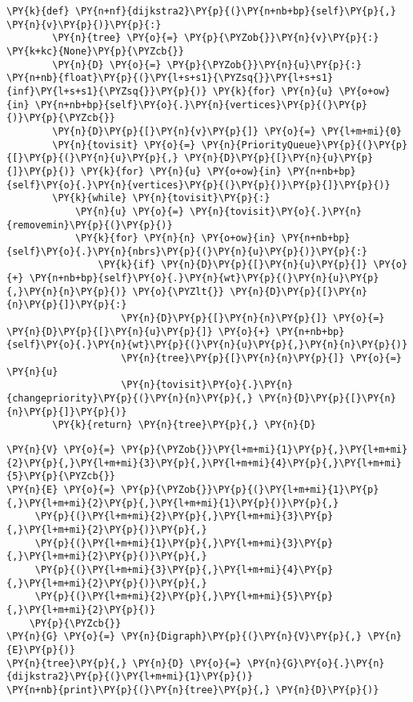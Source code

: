 \begin{Verbatim}[commandchars=\\\{\}]
    \PY{k}{def} \PY{n+nf}{dijkstra2}\PY{p}{(}\PY{n+nb+bp}{self}\PY{p}{,} \PY{n}{v}\PY{p}{)}\PY{p}{:}
        \PY{n}{tree} \PY{o}{=} \PY{p}{\PYZob{}}\PY{n}{v}\PY{p}{:} \PY{k+kc}{None}\PY{p}{\PYZcb{}}
        \PY{n}{D} \PY{o}{=} \PY{p}{\PYZob{}}\PY{n}{u}\PY{p}{:} \PY{n+nb}{float}\PY{p}{(}\PY{l+s+s1}{\PYZsq{}}\PY{l+s+s1}{inf}\PY{l+s+s1}{\PYZsq{}}\PY{p}{)} \PY{k}{for} \PY{n}{u} \PY{o+ow}{in} \PY{n+nb+bp}{self}\PY{o}{.}\PY{n}{vertices}\PY{p}{(}\PY{p}{)}\PY{p}{\PYZcb{}}
        \PY{n}{D}\PY{p}{[}\PY{n}{v}\PY{p}{]} \PY{o}{=} \PY{l+m+mi}{0}
        \PY{n}{tovisit} \PY{o}{=} \PY{n}{PriorityQueue}\PY{p}{(}\PY{p}{[}\PY{p}{(}\PY{n}{u}\PY{p}{,} \PY{n}{D}\PY{p}{[}\PY{n}{u}\PY{p}{]}\PY{p}{)} \PY{k}{for} \PY{n}{u} \PY{o+ow}{in} \PY{n+nb+bp}{self}\PY{o}{.}\PY{n}{vertices}\PY{p}{(}\PY{p}{)}\PY{p}{]}\PY{p}{)}
        \PY{k}{while} \PY{n}{tovisit}\PY{p}{:}
            \PY{n}{u} \PY{o}{=} \PY{n}{tovisit}\PY{o}{.}\PY{n}{removemin}\PY{p}{(}\PY{p}{)}
            \PY{k}{for} \PY{n}{n} \PY{o+ow}{in} \PY{n+nb+bp}{self}\PY{o}{.}\PY{n}{nbrs}\PY{p}{(}\PY{n}{u}\PY{p}{)}\PY{p}{:}
                \PY{k}{if} \PY{n}{D}\PY{p}{[}\PY{n}{u}\PY{p}{]} \PY{o}{+} \PY{n+nb+bp}{self}\PY{o}{.}\PY{n}{wt}\PY{p}{(}\PY{n}{u}\PY{p}{,}\PY{n}{n}\PY{p}{)} \PY{o}{\PYZlt{}} \PY{n}{D}\PY{p}{[}\PY{n}{n}\PY{p}{]}\PY{p}{:}
                    \PY{n}{D}\PY{p}{[}\PY{n}{n}\PY{p}{]} \PY{o}{=} \PY{n}{D}\PY{p}{[}\PY{n}{u}\PY{p}{]} \PY{o}{+} \PY{n+nb+bp}{self}\PY{o}{.}\PY{n}{wt}\PY{p}{(}\PY{n}{u}\PY{p}{,}\PY{n}{n}\PY{p}{)}
                    \PY{n}{tree}\PY{p}{[}\PY{n}{n}\PY{p}{]} \PY{o}{=} \PY{n}{u}
                    \PY{n}{tovisit}\PY{o}{.}\PY{n}{changepriority}\PY{p}{(}\PY{n}{n}\PY{p}{,} \PY{n}{D}\PY{p}{[}\PY{n}{n}\PY{p}{]}\PY{p}{)}
        \PY{k}{return} \PY{n}{tree}\PY{p}{,} \PY{n}{D}
\end{Verbatim}


\begin{Verbatim}[commandchars=\\\{\}]
\PY{n}{V} \PY{o}{=} \PY{p}{\PYZob{}}\PY{l+m+mi}{1}\PY{p}{,}\PY{l+m+mi}{2}\PY{p}{,}\PY{l+m+mi}{3}\PY{p}{,}\PY{l+m+mi}{4}\PY{p}{,}\PY{l+m+mi}{5}\PY{p}{\PYZcb{}}
\PY{n}{E} \PY{o}{=} \PY{p}{\PYZob{}}\PY{p}{(}\PY{l+m+mi}{1}\PY{p}{,}\PY{l+m+mi}{2}\PY{p}{,}\PY{l+m+mi}{1}\PY{p}{)}\PY{p}{,}
     \PY{p}{(}\PY{l+m+mi}{2}\PY{p}{,}\PY{l+m+mi}{3}\PY{p}{,}\PY{l+m+mi}{2}\PY{p}{)}\PY{p}{,}
     \PY{p}{(}\PY{l+m+mi}{1}\PY{p}{,}\PY{l+m+mi}{3}\PY{p}{,}\PY{l+m+mi}{2}\PY{p}{)}\PY{p}{,}
     \PY{p}{(}\PY{l+m+mi}{3}\PY{p}{,}\PY{l+m+mi}{4}\PY{p}{,}\PY{l+m+mi}{2}\PY{p}{)}\PY{p}{,}
     \PY{p}{(}\PY{l+m+mi}{2}\PY{p}{,}\PY{l+m+mi}{5}\PY{p}{,}\PY{l+m+mi}{2}\PY{p}{)}
    \PY{p}{\PYZcb{}}
\PY{n}{G} \PY{o}{=} \PY{n}{Digraph}\PY{p}{(}\PY{n}{V}\PY{p}{,} \PY{n}{E}\PY{p}{)}
\PY{n}{tree}\PY{p}{,} \PY{n}{D} \PY{o}{=} \PY{n}{G}\PY{o}{.}\PY{n}{dijkstra2}\PY{p}{(}\PY{l+m+mi}{1}\PY{p}{)}
\PY{n+nb}{print}\PY{p}{(}\PY{n}{tree}\PY{p}{,} \PY{n}{D}\PY{p}{)}
\end{Verbatim}



